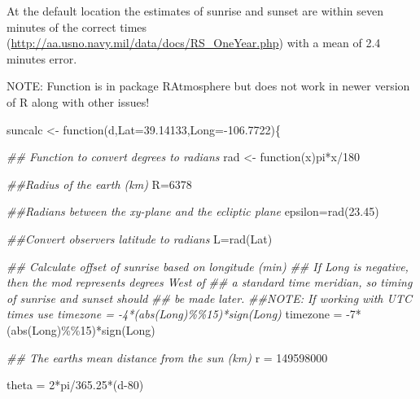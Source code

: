 \documentclass[
  letterpaper,
]{book}
\newenvironment{Shaded}{\begin{snugshade}}{\end{snugshade}}
\newcommand{\AttributeTok}[1]{\textcolor[rgb]{0.40,0.45,0.13}{#1}}
\newcommand{\ControlFlowTok}[1]{\textcolor[rgb]{0.00,0.23,0.31}{#1}}
\newcommand{\DecValTok}[1]{\textcolor[rgb]{0.68,0.00,0.00}{#1}}
\newcommand{\DocumentationTok}[1]{\textcolor[rgb]{0.37,0.37,0.37}{\textit{#1}}}
\newcommand{\FloatTok}[1]{\textcolor[rgb]{0.68,0.00,0.00}{#1}}
\newcommand{\FunctionTok}[1]{\textcolor[rgb]{0.28,0.35,0.67}{#1}}
\newcommand{\NormalTok}[1]{\textcolor[rgb]{0.00,0.23,0.31}{#1}}
\newcommand{\OtherTok}[1]{\textcolor[rgb]{0.00,0.23,0.31}{#1}}
\newcommand{\SpecialCharTok}[1]{\textcolor[rgb]{0.37,0.37,0.37}{#1}}
\begin{document}
At the default location the estimates of sunrise and sunset are within
seven minutes of the correct times
(\url{http://aa.usno.navy.mil/data/docs/RS_OneYear.php}) with a mean of
2.4 minutes error.

NOTE: Function is in package RAtmosphere but does not work in newer
version of R along with other issues!

\begin{Shaded}
\begin{Highlighting}[]
\NormalTok{suncalc }\OtherTok{\textless{}{-}} \ControlFlowTok{function}\NormalTok{(d,}\AttributeTok{Lat=}\FloatTok{39.14133}\NormalTok{,}\AttributeTok{Long=}\SpecialCharTok{{-}}\FloatTok{106.7722}\NormalTok{)\{}
  
  \DocumentationTok{\#\# Function to convert degrees to radians}
\NormalTok{  rad }\OtherTok{\textless{}{-}} \ControlFlowTok{function}\NormalTok{(x)pi}\SpecialCharTok{*}\NormalTok{x}\SpecialCharTok{/}\DecValTok{180}
  
  \DocumentationTok{\#\#Radius of the earth (km)}
\NormalTok{  R}\OtherTok{=}\DecValTok{6378}
  
  \DocumentationTok{\#\#Radians between the xy{-}plane and the ecliptic plane}
\NormalTok{  epsilon}\OtherTok{=}\FunctionTok{rad}\NormalTok{(}\FloatTok{23.45}\NormalTok{)}

  \DocumentationTok{\#\#Convert observer\textquotesingle{}s latitude to radians}
\NormalTok{  L}\OtherTok{=}\FunctionTok{rad}\NormalTok{(Lat)}

  \DocumentationTok{\#\# Calculate offset of sunrise based on longitude (min)}
  \DocumentationTok{\#\# If Long is negative, then the mod represents degrees West of}
  \DocumentationTok{\#\# a standard time meridian, so timing of sunrise and sunset should}
  \DocumentationTok{\#\# be made later.}
  \DocumentationTok{\#\#NOTE: If working with UTC times use timezone = {-}4*(abs(Long)\%\%15)*sign(Long)}
\NormalTok{  timezone }\OtherTok{=} \SpecialCharTok{{-}}\DecValTok{7}\SpecialCharTok{*}\NormalTok{(}\FunctionTok{abs}\NormalTok{(Long)}\SpecialCharTok{\%\%}\DecValTok{15}\NormalTok{)}\SpecialCharTok{*}\FunctionTok{sign}\NormalTok{(Long)}

  \DocumentationTok{\#\# The earth\textquotesingle{}s mean distance from the sun (km)}
\NormalTok{  r }\OtherTok{=} \DecValTok{149598000}

\NormalTok{  theta }\OtherTok{=} \DecValTok{2}\SpecialCharTok{*}\NormalTok{pi}\SpecialCharTok{/}\FloatTok{365.25}\SpecialCharTok{*}\NormalTok{(d}\DecValTok{{-}80}\NormalTok{)}


\end{Highlighting}
\end{Shaded}
\end{document}
